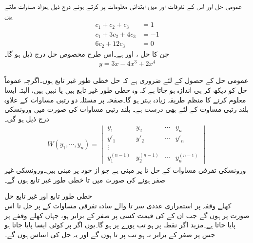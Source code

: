 عمومی حل اور اس کے تفرقات  اور  میں ابتدائی معلومات پر کرتے ہوئے درج ذیل ہمزاد مساوات ملتے ہیں
\begin{align*}
c_1+c_2+c_3&=1\\
c_1+3c_2+4c_3&=-1\\
6c_2+12c_3&=0
\end{align*}
جن کا حل ،  اور  ہے۔اس طرح مخصوص حل درج ذیل ہو گا۔
\begin{align*}
y=3x-4x^3+2x^4
\end{align*}

عمومی حل کے حصول کے لئے ضروری ہے کہ حل خطی طور غیر تابع ہوں۔اگرچہ عموماً حل کو دیکھ کر ہی اندازہ ہو جاتا ہے کہ  وہ خطی طور غیر تابع ہیں یا نہیں ہیں، البتہ ایسا معلوم کرنے کا منظم طریقہ زیادہ بہتر ہو گا۔صفحہ  پر مسئلہ  دو رتبی   مساوات کے علاوہ بلند رتبی مساوت کے لئے بھی درست ہے۔ بلند رتبی مساوات کی صورت میں ورونسکی درج ذیل ہو گی۔
\begin{align}\label{مساوات_سادہ_بلند_ورونسکی_الف}
W(y_1,\cdots, y_n)=
\begin{vmatrix}
y_1 & y_2 & \cdots & y_n\\
y'_1 & y'_2 & \cdots & y'_n\\
\vdots & & \\
y_1^{(n-1)} & y_2^{(n-1)} & \cdots & y_n^{(n-1)}
\end{vmatrix}
\end{align}
ورونسکی تفرقی مساوات کے حل  تا  پر مبنی ہے جو از خود  پر مبنی ہیں۔ورونسکی غیر صفر ہونے کی صورت میں   تا  خطی طور غیر تابع ہوں گے۔

\quad خطی طور تابع اور غیر تابع حل\\
کھلے وقفہ  پر استمراری  عددی سر  تا    والے سادہ تفرقی  مساوات  کے   پر حل  تا  اس صورت  پر   ہوں گے جب ان کے  کی قیمت  کسی  پر صفر کے برابر  ہو، جہاں  کھلے وقفے  پر پایا جاتا ہے۔مزید اگر  نقطہ  پر  ہو تب پورے  پر   ہو گا۔یوں اگر  پر کوئی ایسا  پایا جاتا ہو جس پر  صفر کے برابر نہ ہو تب  پر   تا   ہوں گے  اور یہ حل کی اساس ہوں گے۔

